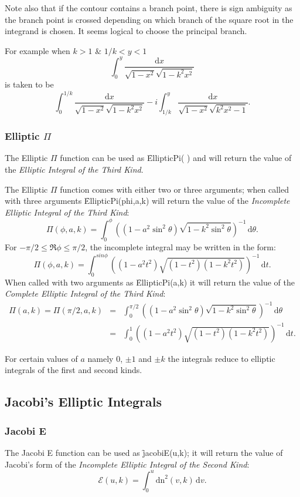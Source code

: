 Note also that if the contour contains a branch point, there is sign ambiguity as the
branch point is crossed depending on which branch of the square root in the integrand is
chosen. It seems logical to choose the principal branch. 

For example when $k>1$ \& $1/k < y <1$
\[ \int_0^y \frac{\mathrm{d}x}{\sqrt{1-x^2}\sqrt{1-k^2x^2}}\]
is taken to be
\[\int_0^{1/k} \frac{\mathrm{d}x}{\sqrt{1-x^2}\sqrt{1-k^2x^2}}
-i\int_{1/k}^y \frac{\mathrm{d}x}{\sqrt{1-x^2}\sqrt{k^2x^2-1}}.\]

\subsubsection{Elliptic $\Pi$}
\hypertarget{operator:ELLIPTICPI}{}
The Elliptic $\Pi$ function can be used as \f{EllipticPi( )} and
will return the value of the \emph{Elliptic Integral of the
Third Kind}.

The Elliptic $\Pi$ function comes with either two or three arguments;
when called with three arguments \f{EllipticPi(phi,a,k)} will return the
value of the \emph{Incomplete Elliptic Integral of the Third Kind}:
\[\Pi(\phi,a,k)=\int_0^{\phi}
\left((1-a^2\sin^2 \theta)\sqrt{1-k^2 \sin^2 \theta}\right)^{-1}
\,\mathrm{d}\theta.\]
For $-\pi/2 \leq \Re{\phi} \leq \pi/2$, the incomplete integral may be written in
the form:
\[\Pi(\phi,a,k)=\int_0^{sin \phi}
\left((1-a^2t^2)\sqrt{(1-t^2)(1-k^2t^2)}\right)^{-1}\,\mathrm{d}t.\]
When called with two arguments as \f{EllipticPi(a,k)}
it will return the value of the
\emph{Complete Elliptic Integral of the Third Kind}:
\begin{eqnarray*}
  \Pi(a, k)= \Pi(\pi/2,a,k) & = &
\int_0^{\pi/2} \left((1-a^2\sin^2 \theta)\sqrt{1-k^2 \sin^2 \theta}\right)^{-1}
\,\mathrm{d}\theta \\
& =& \int_0^1 \left((1-a^2t^2)\sqrt{(1-t^2)(1-k^2t^2)}\right)^{-1}\,\mathrm{d}t.
\end{eqnarray*}

For certain values of $a$ namely $0$, $\pm 1$ and $\pm k$ the integrals reduce
to elliptic integrals of the first and second kinds.

\subsection{Jacobi's Elliptic Integrals}
\subsubsection{Jacobi E}
\hypertarget{operator:JACOBIE}{}
The Jacobi E function can be used as  \f{jacobiE(u,k)};
it will return the value of Jacobi's form of
the \emph{Incomplete Elliptic Integral of the Second Kind}:
\[\mathcal{E}(u, k)=\int_0^u \mathrm{dn}^2 (v, k) \,\mathrm{d}v.\]

